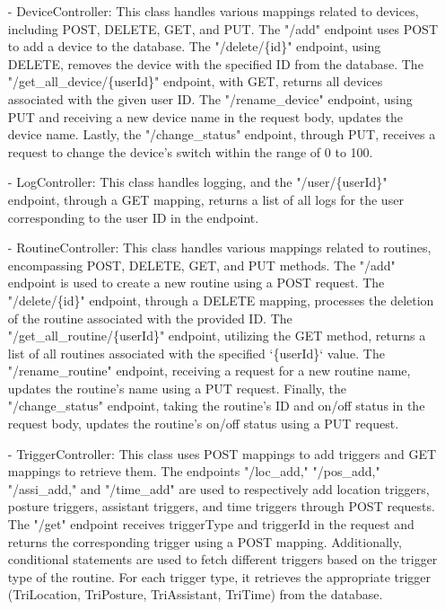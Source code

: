 \begin{enumerate}
                        \item[-] DeviceController: This class handles various mappings related to devices, including POST, DELETE, GET, and PUT. The "/add" endpoint uses POST to add a device to the database. The "/delete/\{id\}" endpoint, using DELETE, removes the device with the specified ID from the database. The "/get\_all\_device/\{userId\}" endpoint, with GET, returns all devices associated with the given user ID. The "/rename\_device" endpoint, using PUT and receiving a new device name in the request body, updates the device name. Lastly, the "/change\_status" endpoint, through PUT, receives a request to change the device's switch within the range of 0 to 100. \\
                        \item[-] LogController: This class handles logging, and the "/user/\{userId\}" endpoint, through a GET mapping, returns a list of all logs for the user corresponding to the user ID in the endpoint. \\
                        \item[-] RoutineController: This class handles various mappings related to routines, encompassing POST, DELETE, GET, and PUT methods. The "/add" endpoint is used to create a new routine using a POST request. The "/delete/\{id\}" endpoint, through a DELETE mapping, processes the deletion of the routine associated with the provided ID. The "/get\_all\_routine/\{userId\}" endpoint, utilizing the GET method, returns a list of all routines associated with the specified `\{userId\}` value. The "/rename\_routine" endpoint, receiving a request for a new routine name, updates the routine's name using a PUT request. Finally, the "/change\_status" endpoint, taking the routine's ID and on/off status in the request body, updates the routine's on/off status using a PUT request. \\
                        \item[-] TriggerController: This class uses POST mappings to add triggers and GET mappings to retrieve them. The endpoints "/loc\_add," "/pos\_add," "/assi\_add," and "/time\_add" are used to respectively add location triggers, posture triggers, assistant triggers, and time triggers through POST requests. The "/get" endpoint receives triggerType and triggerId in the request and returns the corresponding trigger using a POST mapping. Additionally, conditional statements are used to fetch different triggers based on the trigger type of the routine. For each trigger type, it retrieves the appropriate trigger (TriLocation, TriPosture, TriAssistant, TriTime) from the database. \\

\end{enumerate}
